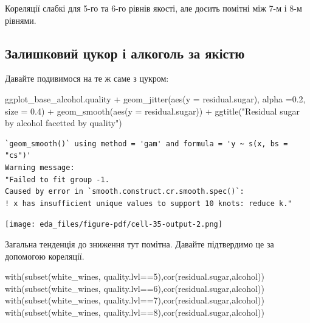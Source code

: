 \documentclass[
  letterpaper,
  DIV=11,
  numbers=noendperiod]{scrreprt}
\newenvironment{Shaded}{\begin{snugshade}}{\end{snugshade}}
\newcommand{\AttributeTok}[1]{\textcolor[rgb]{0.40,0.45,0.13}{#1}}
\newcommand{\DecValTok}[1]{\textcolor[rgb]{0.68,0.00,0.00}{#1}}
\newcommand{\FloatTok}[1]{\textcolor[rgb]{0.68,0.00,0.00}{#1}}
\newcommand{\FunctionTok}[1]{\textcolor[rgb]{0.28,0.35,0.67}{#1}}
\newcommand{\NormalTok}[1]{\textcolor[rgb]{0.00,0.23,0.31}{#1}}
\newcommand{\SpecialCharTok}[1]{\textcolor[rgb]{0.37,0.37,0.37}{#1}}
\newcommand{\StringTok}[1]{\textcolor[rgb]{0.13,0.47,0.30}{#1}}
\begin{document}
Кореляції слабкі для 5-го та 6-го рівнів якості, але досить помітні між
7-м і 8-м рівнями.

\subsection{Залишковий цукор і алкоголь за
якістю}\label{ux437ux430ux43bux438ux448ux43aux43eux432ux438ux439-ux446ux443ux43aux43eux440-ux456-ux430ux43bux43aux43eux433ux43eux43bux44c-ux437ux430-ux44fux43aux456ux441ux442ux44e}

Давайте подивимося на те ж саме з цукром:

\begin{Shaded}
\begin{Highlighting}[]
\NormalTok{ggplot\_base\_alcohol.quality }\SpecialCharTok{+}
  \FunctionTok{geom\_jitter}\NormalTok{(}\FunctionTok{aes}\NormalTok{(}\AttributeTok{y =}\NormalTok{ residual.sugar), }\AttributeTok{alpha =}\FloatTok{0.2}\NormalTok{, }\AttributeTok{size =} \FloatTok{0.4}\NormalTok{) }\SpecialCharTok{+}
  \FunctionTok{geom\_smooth}\NormalTok{(}\FunctionTok{aes}\NormalTok{(}\AttributeTok{y =}\NormalTok{ residual.sugar)) }\SpecialCharTok{+}
  \FunctionTok{ggtitle}\NormalTok{(}\StringTok{"Residual sugar by alcohol facetted by quality"}\NormalTok{)}
\end{Highlighting}
\end{Shaded}

\begin{verbatim}
`geom_smooth()` using method = 'gam' and formula = 'y ~ s(x, bs = "cs")'
Warning message:
"Failed to fit group -1.
Caused by error in `smooth.construct.cr.smooth.spec()`:
! x has insufficient unique values to support 10 knots: reduce k."
\end{verbatim}

\texttt{[image: eda\_files/figure-pdf/cell-35-output-2.png]}

Загальна тенденція до зниження тут помітна. Давайте підтвердимо це за
допомогою кореляції.

\begin{Shaded}
\begin{Highlighting}[]
\FunctionTok{with}\NormalTok{(}\FunctionTok{subset}\NormalTok{(white\_wines, quality.lvl}\SpecialCharTok{==}\DecValTok{5}\NormalTok{),}\FunctionTok{cor}\NormalTok{(residual.sugar,alcohol))}
\FunctionTok{with}\NormalTok{(}\FunctionTok{subset}\NormalTok{(white\_wines, quality.lvl}\SpecialCharTok{==}\DecValTok{6}\NormalTok{),}\FunctionTok{cor}\NormalTok{(residual.sugar,alcohol))}
\FunctionTok{with}\NormalTok{(}\FunctionTok{subset}\NormalTok{(white\_wines, quality.lvl}\SpecialCharTok{==}\DecValTok{7}\NormalTok{),}\FunctionTok{cor}\NormalTok{(residual.sugar,alcohol))}
\FunctionTok{with}\NormalTok{(}\FunctionTok{subset}\NormalTok{(white\_wines, quality.lvl}\SpecialCharTok{==}\DecValTok{8}\NormalTok{),}\FunctionTok{cor}\NormalTok{(residual.sugar,alcohol))}
\end{Highlighting}
\end{Shaded}
\end{document}

